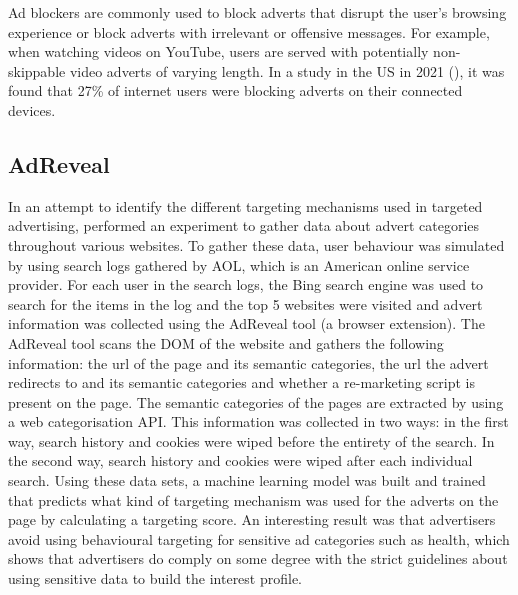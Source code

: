 \documentclass{l4proj}
\begin{document}
Ad blockers are commonly used to block adverts that disrupt the user's browsing experience or block adverts with irrelevant or offensive messages. For example, when watching videos on YouTube, users are served with potentially non-skippable video adverts of varying length. In a study in the US in 2021 (\cite{stats}), it was found that 27\% of internet users were blocking adverts on their connected devices. 


\subsection{AdReveal}
In an attempt to identify the different targeting mechanisms used in targeted advertising, \cite{Liu2013} performed an experiment to gather data about advert categories throughout various websites. To gather these data, user behaviour was simulated by using search logs gathered by AOL, which is an American online service provider. 
For each user in the search logs, the Bing search engine was used to search for the items in the log and the top 5 websites were visited and advert information was collected using the AdReveal tool (a browser extension). The AdReveal tool scans the DOM of the website and gathers the following information: the url of the page and its semantic categories, the url the advert redirects to and its semantic categories and whether a re-marketing script is present on the page. The semantic categories of the pages are extracted by using a web categorisation API. 
This information was collected in two ways: in the first way, search history and cookies were wiped before the entirety of the search. In the second way, search history and cookies were wiped after each individual search. Using these data sets, a machine learning model was built and trained that predicts what kind of targeting mechanism was used for the adverts on the page by calculating a targeting score. An interesting result was that advertisers avoid using behavioural targeting for sensitive ad categories such as health, which shows that advertisers do comply on some degree with the strict guidelines about using sensitive data to build the interest profile.
\end{document}

